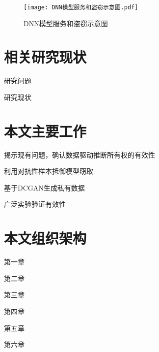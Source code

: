 \begin{figure}[htbp]%
	\centering
	\texttt{[image: DNN模型服务和盗窃示意图.pdf]}
	\setlength{\abovecaptionskip}{5mm} %
	\caption{DNN模型服务和盗窃示意图}
	\label{DNN模型服务和盗窃示意图}
	\end {figure}

\section{相关研究现状}

研究问题

研究现状

\section{本文主要工作}

揭示\cite{maini2021dataset}现有问题，确认数据驱动推断所有权的有效性

利用对抗性样本抵御模型窃取

基于DCGAN生成私有数据

广泛实验验证有效性

\section{本文组织架构}

第一章

第二章

第三章

第四章

第五章

第六章